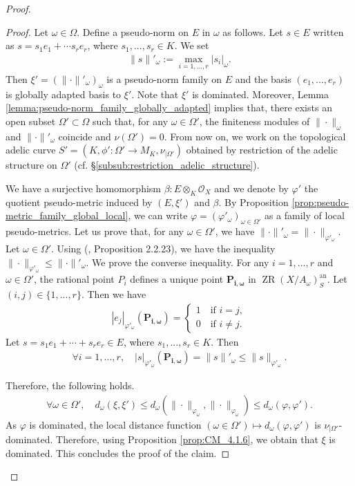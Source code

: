 \documentclass [11pt,reqno]{amsart}
\newcommand{\1}{\mathmybb{1}}
\def\cO{{\mathcal{O}}}
\def\an{\operatorname{an}}
\def\ZR{\operatorname{ZR}}
\begin{document}
\begin{proof}
\begin{proof}
Let $\omega\in\Omega$. Define a pseudo-norm on $E$ in $\omega$ as follows. Let $s\in E$ written as $s=s_1e_1 +\cdots s_re_r$, where $s_1,...,s_r\in K$. We set
\begin{align*}
\|s\|'_{\omega} := \displaystyle\max_{i=1,...,r} |s_i|_{\omega}.
\end{align*}
Then $\xi'=(\|\cdot\|'_{\omega})_{\omega}$ is a pseudo-norm family on $E$ and the basis $(e_1,...,e_r)$ is globally adapted basis to $\xi'$. Note that $\xi'$ is dominated. Moreover, Lemma \ref{lemma:pseudo-norm_family_globally_adapted} implies that, there exists an open subset $\Omega'\subset \Omega$ such that, for any $\omega\in\Omega'$, the finiteness modules of $\|\cdot\|_{\omega}$ and $\|\cdot\|'_{\omega}$ coincide and $\nu(\Omega')=0$. From now on, we work on the topological adelic curve $S'=(K,\phi' : \Omega' \to M_{K},\nu_{|\Omega'})$ obtained by restriction of the adelic structure on $\Omega'$ (cf. \S \ref{subsub:restriction_adelic_structure}). 

We have a  surjective homomorphism $\beta:E\otimes_{K}\cO_{X}$ and we denote by $\varphi'$ the quotient pseudo-metric induced by $(E,\xi')$ and $\beta$. By Proposition \ref{prop:pseudo-metric_family_global_local}, we can write $\varphi=(\varphi'_{\omega})_{\omega\in\Omega'}$ as a family of local pseudo-metrics. Let us prove that, for any $\omega\in \Omega'$, we have $\|\cdot\|'_{\omega}=\|\cdot\|_{\varphi'_{\omega}}$. Let $\omega\in\Omega'$. Using (\cite{ChenMori}, Proposition 2.2.23), we have the inequality $\|\cdot\|_{\varphi'_{\omega}}\leq\|\cdot\|'_{\omega}$. We prove the converse inequality. For any $i=1,...,r$ and $\omega\in\Omega'$, the rational point $P_{i}$ defines a unique point $\mathbf{P_{i,\omega}}$ in $\ZR(X/A_{\omega})_{S}^{\an}$. Let $(i,j)\in \{1,...,r\}$. Then we have
\begin{align*}
|e_j|_{\varphi'_{\omega}}(\mathbf{P_{i,\omega}}) =  \left\{\begin{matrix}
1 \quad \text{if } i=j, \\
0 \quad \text{if } i\neq j.\end{matrix}\right.
\end{align*}
Let $s=s_1e_1+\cdots+s_re_r \in E$, where $s_1,...,s_r\in K$. Then
\begin{align*}
\forall i=1,...,r, \quad |s|_{\varphi'_{\omega}}(\mathbf{P_{i,\omega}}) = \|s\|'_{\omega} \leq \|s\|_{\varphi'_{\omega}}.
\end{align*} 

Therefore, the following holds.
\begin{align*}
\forall \omega\in \Omega', \quad d_{\omega}(\xi,\xi') \leq d_{\omega}(\|\cdot\|_{\varphi_{\omega}},\|\cdot\|_{\varphi_{\omega}}) \leq d_{\omega}(\varphi,\varphi').
\end{align*}
As $\varphi$ is dominated, the local distance function $(\omega\in\Omega') \mapsto d_{\omega}(\varphi,\varphi')$ is $\nu_{|\Omega'}$-dominated. Therefore, using Proposition \ref{prop:CM_4.1.6}, we obtain that $\xi$ is dominated. This concludes the proof of the claim.
\end{proof}
 

\end{proof}
\end{document}
